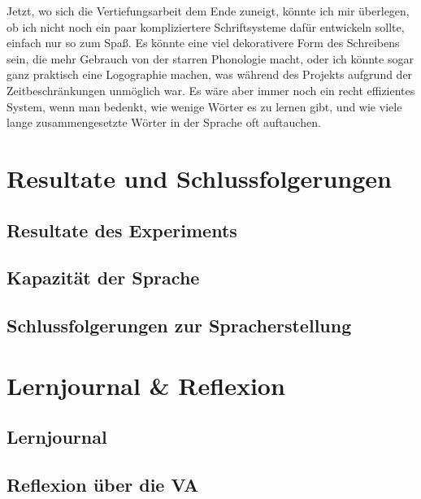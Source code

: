 \documentclass{article}
\begin{document}
Jetzt, wo sich die Vertiefungsarbeit dem Ende zuneigt, könnte ich mir überlegen, ob ich nicht noch ein paar
kompliziertere Schriftsysteme dafür entwickeln sollte, einfach nur so zum Spaß. Es könnte eine viel dekorativere
Form des Schreibens sein, die mehr Gebrauch von der starren Phonologie macht, oder ich könnte sogar ganz praktisch
eine Logographie machen, was während des Projekts aufgrund der Zeitbeschränkungen unmöglich war.
Es wäre aber immer noch ein recht effizientes System, wenn man bedenkt, wie wenige Wörter es zu lernen gibt,
und wie viele lange zusammengesetzte Wörter in der Sprache oft auftauchen.




\section{Resultate und Schlussfolgerungen}
\subsection{Resultate des Experiments}


\subsection{Kapazität der Sprache}


\subsection{Schlussfolgerungen zur Spracherstellung}




\section{Lernjournal \& Reflexion}
\subsection{Lernjournal}

\subsection{Reflexion über die VA}







\renewcommand{\section}[1]{\newpage\vspace*{\fill}\Huge{#1}\vspace*{\fill}}
\end{document}
